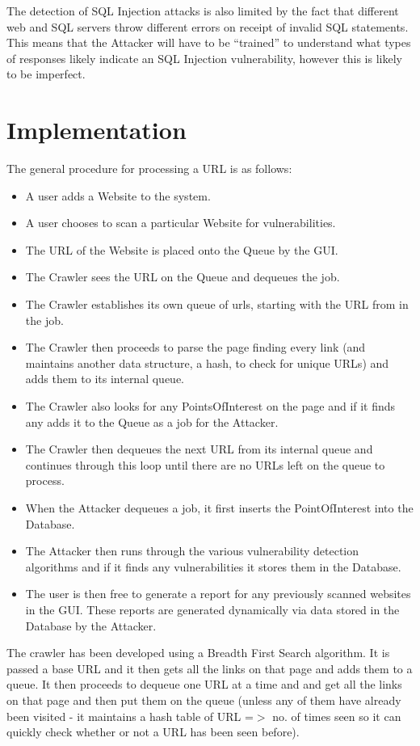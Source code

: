 \documentclass[12pt,a4paper]{article}
\begin{document}
The detection of SQL Injection attacks is also limited by the fact that different web and SQL servers throw different errors on receipt of invalid SQL statements.  This means that the Attacker will have to be “trained” to understand what types of responses likely indicate an SQL Injection vulnerability, however this is likely to be imperfect.

\section{Implementation}
The general procedure for processing a URL is as follows:

\begin{itemize}
    \item A user adds a Website to the system.
    \item A user chooses to scan a particular Website for vulnerabilities.
    \item The URL of the Website is placed onto the Queue by the GUI.
    \item The Crawler sees the URL on the Queue and dequeues the job.
    \item The Crawler establishes its own queue of urls, starting with the URL from in the job.
    \item The Crawler then proceeds to parse the page finding every link (and maintains another data structure, a hash, to check for unique URLs) and adds them to its internal queue.
    \item The Crawler also looks for any PointsOfInterest on the page and if it finds any adds it to the Queue as a job for the Attacker.
    \item The Crawler then dequeues the next URL from its internal queue and continues through this loop until there are no URLs left on the queue to process.
    \item When the Attacker dequeues a job, it first inserts the PointOfInterest into the Database.
    \item The Attacker then runs through the various vulnerability detection algorithms and if it finds any vulnerabilities it stores them in the Database.
    \item The user is then free to generate a report for any previously scanned websites in the GUI.  These reports are generated dynamically via data stored in the Database by the Attacker.
\end{itemize}

The crawler has been developed using a Breadth First Search algorithm.  It is passed a base URL and it then gets all the links on that page and adds them to a queue.  It then proceeds to dequeue one URL at a time and and get all the links on that page and then put them on the queue (unless any of them have already been visited - it maintains a hash table of URL =$>$ no. of times seen so it can quickly check whether or not a URL has been seen before).
\end{document}
